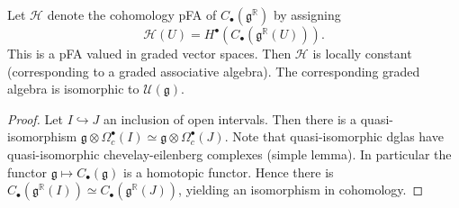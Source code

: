 \begin{proposition}[3.4.1]\label{askjas}
	Let $\mathcal{H} $ denote the cohomology pFA of $C_{\bullet} (\mathfrak{g}^\mathbb{R} ) $ by assigning
	\[
		\mathcal{H} (U)=H^{\bullet} (C_{\bullet} (\mathfrak{g} ^\mathbb{R} (U)))
	.\]
	This is a pFA valued in graded vector spaces. Then $\mathcal{H} $ is locally constant (corresponding to a graded associative algebra). The corresponding graded algebra is isomorphic to $\mathcal{U} (\mathfrak{g} )$.
\end{proposition}
\begin{proof}
	Let $I\hookrightarrow J$ an inclusion of open intervals. Then there is a quasi-isomorphism $\mathfrak{g} \otimes \Omega^{\bullet} _c(I)\simeq \mathfrak{g} \otimes \Omega ^{\bullet} _c(J)$. Note that quasi-isomorphic dglas have quasi-isomorphic chevelay-eilenberg complexes (simple lemma). In particular the functor $\mathfrak{g} \mapsto C_{\bullet} (\mathfrak{g} )$ is a homotopic functor. Hence there is $C_{\bullet} (\mathfrak{g} ^\mathbb{R} (I))\simeq C_{\bullet} (\mathfrak{g} ^\mathbb{R} (J))$, yielding an isomorphism in cohomology.
\end{proof}

